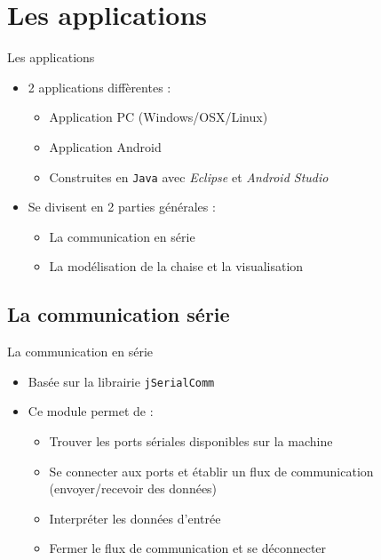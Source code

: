 \documentclass{beamer}
\begin{document}
\section{Les applications}
\begin{frame}
\begin{block}{Les applications}
\pause
\begin{itemize}
\item 2 applications diffèrentes :
\pause
\begin{itemize}
\item Application PC (Windows/OSX/Linux)
\pause
\item Application Android
\pause
\item Construites en \texttt{Java} avec \textit{Eclipse} et \textit{Android Studio}
\end{itemize}
\item Se divisent en 2 parties générales :
\pause
\begin{itemize}
\item La communication en série
\pause
\item La modélisation de la chaise et la visualisation
\end{itemize}
\end{itemize}
\end{block}
\end{frame}

\subsection{La communication série}
\begin{frame}
\begin{block}{La communication en série}
\pause
\begin{itemize}
\item Basée sur la librairie \texttt{jSerialComm}
\pause
\item Ce module permet de :
\pause
\begin{itemize}
\item Trouver les ports sériales disponibles sur la machine
\pause
\item Se connecter aux ports et établir un flux de communication (envoyer/recevoir des données)
\pause
\item Interpréter les données d'entrée
\pause
\item Fermer le flux de communication et se déconnecter
\end{itemize}
\end{itemize}
\end{block}
\end{frame}
\end{document}
